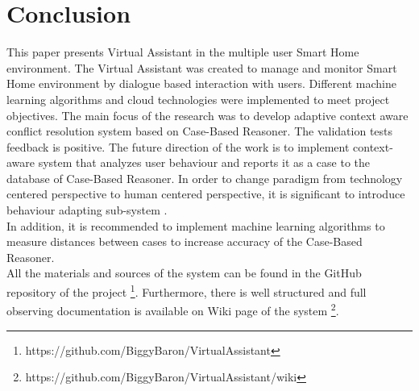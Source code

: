 \documentclass{llncs}
\begin{document}
    \section{Conclusion}
    This paper presents Virtual Assistant in the multiple user Smart Home environment.
    The Virtual Assistant was created
    to manage and monitor Smart Home environment by dialogue based interaction with users.
    Different machine learning
    algorithms and cloud technologies were implemented to meet project objectives.
    The main focus of the research was to
    develop adaptive context aware conflict resolution system based on Case-Based Reasoner.
    The validation tests feedback is positive.
    The future direction of the work is to implement context-aware system that analyzes user behaviour and reports it as
    a case to the database of Case-Based Reasoner.
    In order to change paradigm from technology centered perspective to human centered perspective,
    it is significant to introduce behaviour adapting sub-system \cite{2}.\\
    In addition, it is recommended to implement machine learning algorithms to measure distances between cases to
    increase accuracy of the Case-Based Reasoner.\\
    All the materials and sources of the system can be found in the GitHub repository of the project \footnote{https://github.com/BiggyBaron/VirtualAssistant}.
    Furthermore, there is well structured and full observing documentation is available on Wiki page of the system \footnote{https://github.com/BiggyBaron/VirtualAssistant/wiki}.
\end{document}
